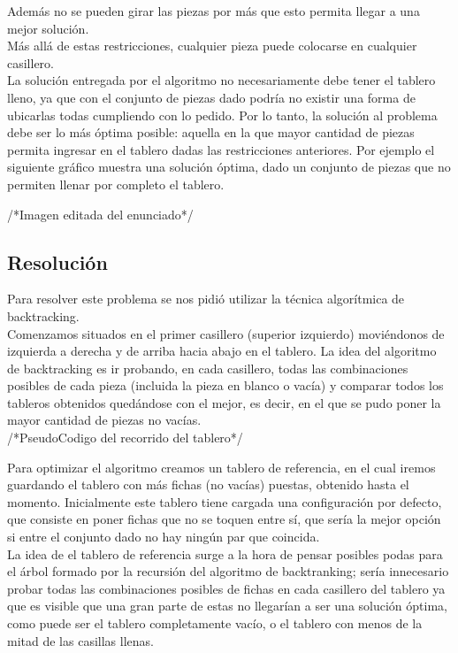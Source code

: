 Adem\'as no se pueden girar las piezas por más que esto permita llegar a una mejor soluci\'on.\\
M\'as all\'a de estas restricciones, cualquier pieza puede colocarse en cualquier casillero.\\
La soluci\'on entregada por el algoritmo no necesariamente debe tener el tablero lleno, ya que con el conjunto de piezas dado podr\'ia no existir una forma de ubicarlas todas cumpliendo con lo pedido. Por lo tanto, la soluci\'on al problema debe ser lo m\'as \'optima posible: aquella en la que mayor cantidad de piezas permita ingresar en el tablero dadas las restricciones anteriores.
Por ejemplo el siguiente gr\'afico muestra una soluci\'on \'optima, dado un conjunto de piezas que no permiten llenar por completo el tablero.

/*Imagen editada del enunciado*/

\subsection{Resoluci\'on}

Para resolver este problema se nos pidi\'o utilizar la t\'ecnica algor\'itmica de backtracking.\\ 
Comenzamos situados en el primer casillero (superior izquierdo) movi\'endonos de izquierda a derecha y de arriba hacia abajo en el tablero. La idea del algoritmo de backtracking es ir probando, en cada casillero, todas las combinaciones posibles de cada pieza (incluida la pieza en blanco o vac\'ia) y comparar todos los tableros obtenidos qued\'andose con el mejor, es decir, en el que se pudo poner la mayor cantidad de piezas no vac\'ias. \\

/*PseudoCodigo del recorrido del tablero*/

Para optimizar el algoritmo creamos un tablero de referencia, en el cual iremos guardando el tablero con m\'as fichas (no vac\'ias) puestas, obtenido hasta el momento. Inicialmente este tablero tiene cargada una configuraci\'on por defecto, que consiste en poner fichas que no se toquen entre s\'i, que ser\'ia la mejor opci\'on si entre el conjunto dado no hay ning\'un par que coincida.\\

La idea de el tablero de referencia surge a la hora de pensar posibles podas para el \'arbol formado por la recursi\'on del algoritmo de backtranking; ser\'ia innecesario probar todas las combinaciones posibles de fichas en cada casillero del tablero ya que es  visible que una gran parte de estas no llegar\'ian a ser una soluci\'on \'optima, como puede ser el tablero completamente vac\'io, o el tablero con menos de la mitad de las casillas llenas.


